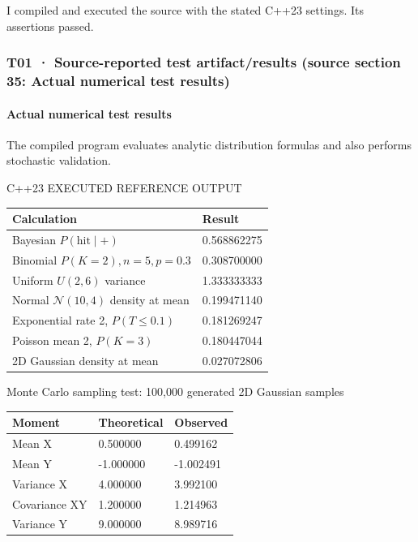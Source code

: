 I compiled and executed the source with the stated C++23 settings. Its assertions passed.

\subsubsection{T01 · Source-reported test artifact/results (source section 35: Actual numerical test results)}\label{02-foundations-ii-ch039-t01-source-reported-test-artifactresults-source-section-35-actual-numerical-test-results}

\paragraph{Actual numerical test results}\label{02-foundations-ii-ch039-actual-numerical-test-results}

The compiled program evaluates analytic distribution formulas and also performs stochastic validation.

C++23 EXECUTED REFERENCE OUTPUT

{\def\LTcaptype{none} %
\begin{longtable}[]{@{}ll@{}}
\toprule\noalign{}
Calculation & Result \\
\midrule\noalign{}
\endhead
\bottomrule\noalign{}
\endlastfoot
Bayesian \(P(\text{hit}\mid+)\) & 0.568862275 \\
Binomial \(P(K=2), n=5,p=0.3\) & 0.308700000 \\
Uniform \(U(2,6)\) variance & 1.333333333 \\
Normal \(\mathcal N(10,4)\) density at mean & 0.199471140 \\
Exponential rate 2, \(P(T\le0.1)\) & 0.181269247 \\
Poisson mean 2, \(P(K=3)\) & 0.180447044 \\
2D Gaussian density at mean & 0.027072806 \\
\end{longtable}
}

Monte Carlo sampling test: 100,000 generated 2D Gaussian samples

{\def\LTcaptype{none} %
\begin{longtable}[]{@{}lll@{}}
\toprule\noalign{}
Moment & Theoretical & Observed \\
\midrule\noalign{}
\endhead
\bottomrule\noalign{}
\endlastfoot
Mean X & 0.500000 & 0.499162 \\
Mean Y & -1.000000 & -1.002491 \\
Variance X & 4.000000 & 3.992100 \\
Covariance XY & 1.200000 & 1.214963 \\
Variance Y & 9.000000 & 8.989716 \\
\end{longtable}
}

